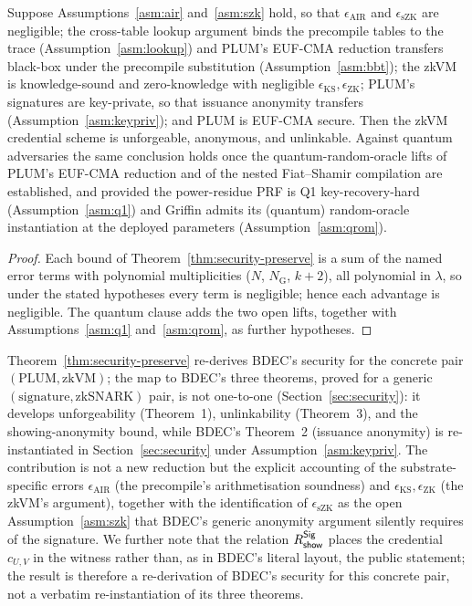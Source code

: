 \begin{corollary}\label{cor:unconditional}
Suppose Assumptions~\ref{asm:air} and~\ref{asm:szk} hold, so that $\epsilon_{\mathrm{AIR}}$ and $\epsilon_{\mathrm{sZK}}$ are negligible; the cross-table lookup argument binds the precompile tables to the trace (Assumption~\ref{asm:lookup}) and PLUM's EUF-CMA reduction transfers black-box under the precompile substitution (Assumption~\ref{asm:bbt}); the zkVM is knowledge-sound and zero-knowledge with negligible $\epsilon_{\mathrm{KS}},\epsilon_{\mathrm{ZK}}$; PLUM's signatures are key-private, so that issuance anonymity transfers (Assumption~\ref{asm:keypriv}); and PLUM is EUF-CMA secure. Then the zkVM credential scheme is unforgeable, anonymous, and unlinkable. Against quantum adversaries the same conclusion holds once the quantum-random-oracle lifts of PLUM's EUF-CMA reduction and of the nested Fiat--Shamir compilation are established, and provided the power-residue PRF is Q1 key-recovery-hard (Assumption~\ref{asm:q1}) and Griffin admits its (quantum) random-oracle instantiation at the deployed parameters (Assumption~\ref{asm:qrom}).
\end{corollary}

\begin{proof}
Each bound of Theorem~\ref{thm:security-preserve} is a sum of the named error terms with polynomial multiplicities ($N$, $N_{\mathrm G}$, $k+2$), all polynomial in $\lambda$, so under the stated hypotheses every term is negligible; hence each advantage is negligible. The quantum clause adds the two open lifts, together with Assumptions~\ref{asm:q1} and~\ref{asm:qrom}, as further hypotheses.
\end{proof}

\begin{remark}\label{rem:reinstantiation}
Theorem~\ref{thm:security-preserve} re-derives BDEC's security for the concrete pair $(\text{PLUM},\text{zkVM})$; the map to BDEC's three theorems, proved for a generic $(\text{signature},\text{zkSNARK})$ pair, is not one-to-one (Section~\ref{sec:security}): it develops unforgeability (Theorem~1), unlinkability (Theorem~3), and the showing-anonymity bound, while BDEC's Theorem~2 (issuance anonymity) is re-instantiated in Section~\ref{sec:security} under Assumption~\ref{asm:keypriv}. The contribution is not a new reduction but the explicit accounting of the substrate-specific errors $\epsilon_{\mathrm{AIR}}$ (the precompile's arithmetisation soundness) and $\epsilon_{\mathrm{KS}},\epsilon_{\mathrm{ZK}}$ (the zkVM's argument), together with the identification of $\epsilon_{\mathrm{sZK}}$ as the open Assumption~\ref{asm:szk} that BDEC's generic anonymity argument silently requires of the signature. We further note that the relation $R^{\mathsf{Sig}}_{\mathsf{show}}$ places the credential $c_{U,V}$ in the witness rather than, as in BDEC's literal layout, the public statement; the result is therefore a re-derivation of BDEC's security for this concrete pair, not a verbatim re-instantiation of its three theorems.
\end{remark}

